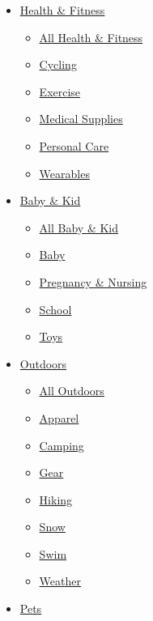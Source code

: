 \begin{itemize}
\begin{itemize}
\begin{itemize}
      \begin{itemize}
      \tightlist
      \item
        \href{/wirecutter/health-fitness/}{Health \& Fitness}

        \begin{itemize}
        \tightlist
        \item
          \href{/wirecutter/health-fitness/}{All Health \& Fitness}
        \item
          \href{/wirecutter/health-fitness/cycling/}{Cycling}
        \item
          \href{/wirecutter/health-fitness/exercise/}{Exercise}
        \item
          \href{/wirecutter/health-fitness/medical-supplies/}{Medical
          Supplies}
        \item
          \href{/wirecutter/health-fitness/personal-care/}{Personal
          Care}
        \item
          \href{/wirecutter/health-fitness/wearables/}{Wearables}
        \end{itemize}
      \item
        \href{/wirecutter/baby-kid/}{Baby \& Kid}

        \begin{itemize}
        \tightlist
        \item
          \href{/wirecutter/baby-kid/}{All Baby \& Kid}
        \item
          \href{/wirecutter/baby-kid/baby/}{Baby}
        \item
          \href{/wirecutter/baby-kid/pregnancy-nursing/}{Pregnancy \&
          Nursing}
        \item
          \href{/wirecutter/baby-kid/school/}{School}
        \item
          \href{/wirecutter/baby-kid/toys/}{Toys}
        \end{itemize}
      \item
        \href{/wirecutter/outdoors/}{Outdoors}

        \begin{itemize}
        \tightlist
        \item
          \href{/wirecutter/outdoors/}{All Outdoors}
        \item
          \href{/wirecutter/outdoors/apparel/}{Apparel}
        \item
          \href{/wirecutter/outdoors/camping/}{Camping}
        \item
          \href{/wirecutter/outdoors/gear/}{Gear}
        \item
          \href{/wirecutter/outdoors/hiking/}{Hiking}
        \item
          \href{/wirecutter/outdoors/snow/}{Snow}
        \item
          \href{/wirecutter/outdoors/swim/}{Swim}
        \item
          \href{/wirecutter/home-garden/weather/}{Weather}
        \end{itemize}
      \item
        \href{/wirecutter/pets/}{Pets}


\end{itemize}
\end{itemize}
\end{itemize}
\end{itemize}

